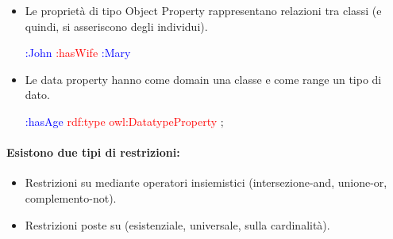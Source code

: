 \begin{itemize}
\begin{center}
\end{center}
\item Le proprietà di tipo Object Property rappresentano relazioni
tra classi (e quindi, si asseriscono degli individui). 
\begin{center}
  \textcolor{blue}{:John} \textcolor{red}{:hasWife} \textcolor{blue}{:Mary}
\end{center}
\item Le data property hanno come domain una classe e come range un tipo
di dato. 
\begin{center}
  \textcolor{blue}{:hasAge} \textcolor{red}{rdf:type owl:DatatypeProperty} ;
\end{center}
\end{itemize}


\paragraph{Esistono due tipi di restrizioni:}

\begin{itemize}
  \item Restrizioni su  mediante operatori insiemistici
(intersezione-and, unione-or, complemento-not). 
\item Restrizioni poste su  (esistenziale, universale,
sulla cardinalità).
\end{itemize}







